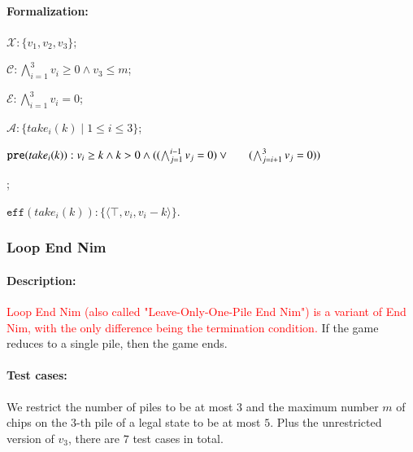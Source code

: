 \documentclass[review]{elsarticle}
\newcommand{\set}[1]{\{ #1 \}}
\newcommand{\tuple}[1]{\langle {#1} \rangle}
\newcommand{\true}{\top}
\newcommand{\statevar}{\mathcal{X}}
\newcommand{\act}{\mathcal{A}}
\newcommand{\constraint}{\mathcal{C}}
\newcommand{\estate}{\mathcal{E}}
\newcommand{\pre}{\mathtt{pre}}
\newcommand{\eff}{\mathtt{eff}}
\begin{document}
\paragraph{Formalization:}
\begin{itemize}
	\item $\statevar: \set{v_1, v_2 ,v_3}$;
	\item $\constraint:\bigwedge_{i=1}^{3} v_i \ge 0 \wedge v_3 \le m$;
	\item $\estate: \bigwedge_{i=1}^{3} v_i = 0$;
	\item $\act:\set{take_i(k) {\mid} 1 \le i \le 3}$;
	\textcolor{red}{\item $\pre(take_i(k)) : v_i \ge k \wedge k > 0 \wedge ((\bigwedge_{j=1}^{i-1}v_j = 0 )\vee \\ \hspace*{6mm}
	(\bigwedge_{j=i+1}^{3}v_j = 0))$};
	\item $\eff(take_i(k)) : \set{\tuple{\true,v_i,v_i -k}}$.
\end{itemize}

\subsubsection{Loop End Nim \protect\cite{AlbN2001}}

\paragraph{Description:} 
\textcolor{red}{Loop End Nim (also called "Leave-Only-One-Pile End Nim") is a variant of End Nim, with the only difference being the termination condition.}
If the game reduces to a single pile, then the game ends. 
\paragraph{Test cases:}
We restrict the number of piles to be at most $3$ and the maximum number $m$ of chips on the $3$-th pile of a legal state to be at most $5$.
Plus the unrestricted version of $v_3$, there are $7$ test cases in total.
\end{document}
